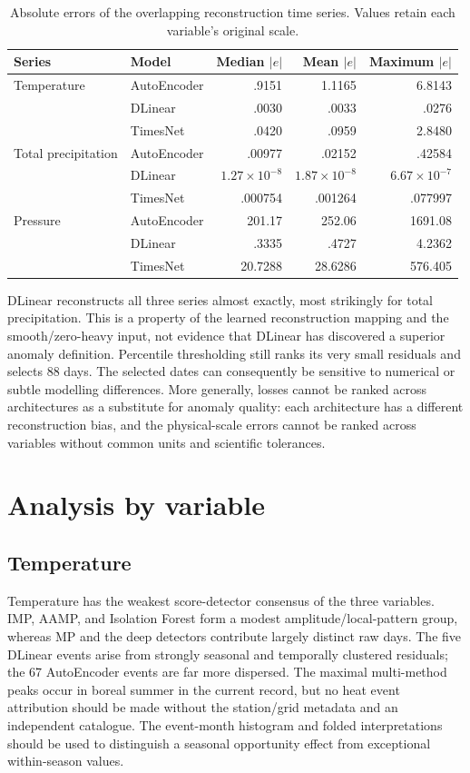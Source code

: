 \documentclass[11pt,a4paper]{article}
\begin{document}
\begin{table}[ht]
\centering
\caption{Absolute errors of the overlapping reconstruction time series. Values
retain each variable's original scale.}
\label{tab:deep-error}
\small
\begin{tabular}{llrrr}
\toprule
Series & Model & Median $|e|$ & Mean $|e|$ & Maximum $|e|$\\
\midrule
Temperature & AutoEncoder & .9151 & 1.1165 & 6.8143\\
 & DLinear & .0030 & .0033 & .0276\\
 & TimesNet & .0420 & .0959 & 2.8480\\
\midrule
Total precipitation & AutoEncoder & .00977 & .02152 & .42584\\
 & DLinear & $1.27\!\times\!10^{-8}$ & $1.87\!\times\!10^{-8}$ & $6.67\!\times\!10^{-7}$\\
 & TimesNet & .000754 & .001264 & .077997\\
\midrule
Pressure & AutoEncoder & 201.17 & 252.06 & 1691.08\\
 & DLinear & .3335 & .4727 & 4.2362\\
 & TimesNet & 20.7288 & 28.6286 & 576.405\\
\bottomrule
\end{tabular}
\end{table}

DLinear reconstructs all three series almost exactly, most strikingly for
total precipitation. This is a property of the learned reconstruction mapping and
the smooth/zero-heavy input, not evidence that DLinear has discovered a
superior anomaly definition. Percentile thresholding still ranks its very
small residuals and selects 88 days. The selected dates can consequently be
sensitive to numerical or subtle modelling differences. More generally,
losses cannot be ranked across architectures as a substitute for anomaly
quality: each architecture has a different reconstruction bias, and the
physical-scale errors cannot be ranked across variables without common units
and scientific tolerances.

\section{Analysis by variable}

\subsection{Temperature}
Temperature has the weakest score-detector consensus of the three variables.
IMP, AAMP, and Isolation Forest form a modest amplitude/local-pattern group,
whereas MP and the deep detectors contribute largely distinct raw days. The
five DLinear events arise from strongly seasonal and temporally clustered
residuals; the 67 AutoEncoder events are far more dispersed. The maximal
multi-method peaks occur in boreal summer in the current record, but no heat
event attribution should be made without the station/grid metadata and an
independent catalogue. The event-month histogram and folded interpretations
should be used to distinguish a seasonal opportunity effect from exceptional
within-season values.
\end{document}
